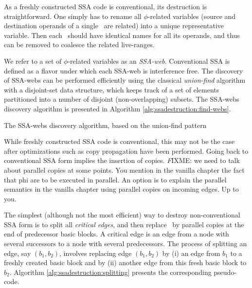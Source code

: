 As a freshly constructed SSA code is conventional, its destruction is straightforward.
One simply has to rename all 
$\phi$-related variables (source and destination operands of
a single \phiop\ are related)
into a unique representative variable.
Then each \phiop\ should have identical names for all its operands,
and thus can be removed to coalesce the related live-ranges.

We refer to a set of $\phi$-related variables as
an \textit{SSA-web}. Conventional SSA is defined as a flavor under which each SSA-web is interference free. The discovery of SSA-webs can be performed efficiently 
using the classical \textit{union-find} algorithm 
with a disjoint-set data structure,
which keeps track of a set of elements
partitioned into a number of disjoint (non-overlapping) subsets.
The SSA-webs discovery algorithm is presented in 
Algorithm \ref{alg:ssadestruction:find-webs}.

\begin{algorithm}
\caption{\label{alg:ssadestruction:find-webs}The SSA-webs discovery algorithm, based on the union-find pattern}
\end{algorithm}


While freshly constructed SSA code is conventional, 
this may not be the case after optimizations 
such as copy propagation have been performed.
Going back to conventional SSA form implies the insertion of copies.
{\emph FIXME: we need to talk about parallel copies at some points. You mention in the vanilla chapter the fact that phi are to be executed in parallel. An option is to explain the parallel semantics in the vanilla chapter using parallel copies on incoming edges. Up to you.}

The simplest (although not the most efficient) way to destroy non-conventional SSA form is to split all \textit{critical edges}, and then replace \phiops\ by parallel copies at the end of predecessor basic blocks.
A critical edge is an edge from a node with several successors to a node with several predecessors.
The process of splitting an edge, say $(b_1,b_2)$,
involves replacing edge $(b_1, b_2)$ by (i) an
edge from $b_1$ to a freshly created basic block 
and by (ii) another edge from this fresh basic block to $b_2$. 
Algorithm \ref{alg:ssadestruction:splitting} presents
the corresponding pseudo-code.

